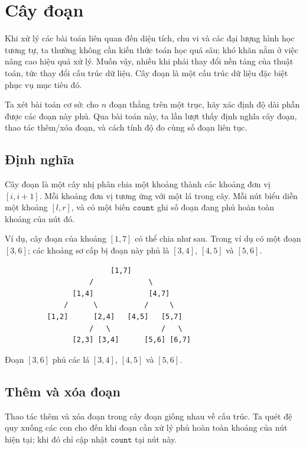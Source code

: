 \documentclass[11pt]{article}
\begin{document}
\section{Cây đoạn}

Khi xử lý các bài toán liên quan đến diện tích, chu vi và các đại lượng hình
học tương tự, ta thường không cần kiến thức toán học quá sâu; khó khăn nằm ở
việc nâng cao hiệu quả xử lý. Muốn vậy, nhiều khi phải thay đổi nền tảng của
thuật toán, tức thay đổi cấu trúc dữ liệu. Cây đoạn là một cấu trúc dữ liệu
đặc biệt phục vụ mục tiêu đó.

Ta xét bài toán cơ sở: cho \(n\) đoạn thẳng trên một trục, hãy xác định độ dài
phần được các đoạn này phủ. Qua bài toán này, ta lần lượt thấy định nghĩa cây
đoạn, thao tác thêm/xóa đoạn, và cách tính độ đo cùng số đoạn liên tục.

\subsection{Định nghĩa}

Cây đoạn là một cây nhị phân chia một khoảng thành các khoảng đơn vị
\([i,i+1]\). Mỗi khoảng đơn vị tương ứng với một lá trong cây. Mỗi nút biểu
diễn một khoảng \([l,r]\), và có một biến \(\texttt{count}\) ghi số đoạn đang
phủ hoàn toàn khoảng của nút đó.

Ví dụ, cây đoạn của khoảng \([1,7]\) có thể chia như sau. Trong ví dụ có một
đoạn \([3,6]\); các khoảng sơ cấp bị đoạn này phủ là \([3,4]\), \([4,5]\) và
\([5,6]\).

\begin{verbatim}
                         [1,7]
                    /             \
                [1,4]             [4,7]
              /      \           /     \
          [1,2]      [2,4]   [4,5]   [5,7]
                    /   \            /   \
                [2,3] [3,4]      [5,6] [6,7]
\end{verbatim}

Đoạn \([3,6]\) phủ các lá \([3,4]\), \([4,5]\) và \([5,6]\).

\subsection{Thêm và xóa đoạn}

Thao tác thêm và xóa đoạn trong cây đoạn giống nhau về cấu trúc. Ta quét đệ
quy xuống các con cho đến khi đoạn cần xử lý phủ hoàn toàn khoảng của nút
hiện tại; khi đó chỉ cập nhật \(\texttt{count}\) tại nút này.
\end{document}
